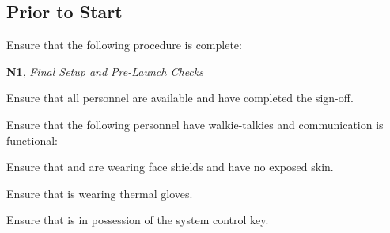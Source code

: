 \subsection{Prior to Start}
\begin{checklist}
    \item Ensure that the following procedure is complete:
    \begin{checklist}
        \item \textbf{N1}, \textit{Final Setup and Pre-Launch Checks}
    \end{checklist}
    \item Ensure that all personnel are available and have completed the sign-off.
    \item Ensure that the following personnel have walkie-talkies and communication is functional:
    \begin{checklist}
        \item \ops{}
        \item \control{}
        \item \primary{}
        \item \secondary{}
    \end{checklist}
    \item Ensure that \primary{} and \secondary{} are wearing face shields and have no exposed skin.
    \item Ensure that \primary{} is wearing thermal gloves.
    \item Ensure that \ops{} is in possession of the system control key.
\end{checklist}
\setcounter{checklistnum}{0}

